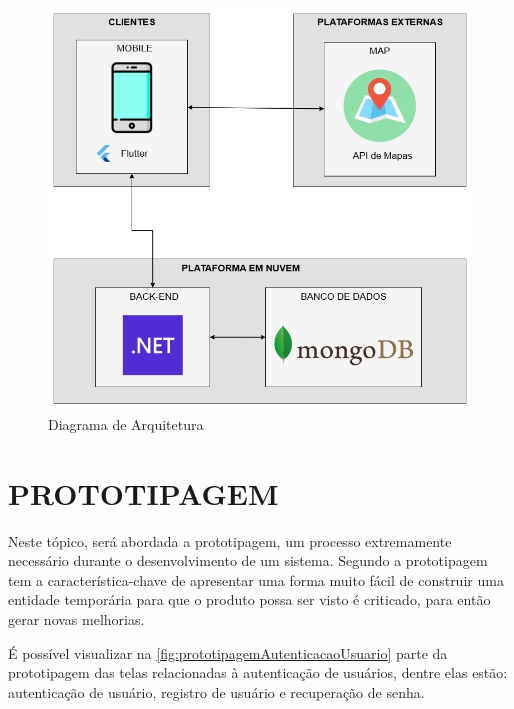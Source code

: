 \begin{figure}[H]
    \centering
    \caption{Diagrama de Arquitetura}
    \label{fig:diagramaArquiteturaDeSoftware}
    \includegraphics[scale=0.38]{./dados/figuras/diagrama-de-arquitetura.png}
\end{figure}

\section{PROTOTIPAGEM}
\label{sec:prototipagem}

Neste tópico, será abordada a prototipagem, um processo extremamente necessário durante o desenvolvimento de um sistema. Segundo  a prototipagem tem a característica-chave de apresentar uma forma muito fácil de construir uma entidade temporária para que o produto possa ser visto é criticado, para então gerar novas melhorias.

É possível visualizar na \autoref{fig:prototipagemAutenticacaoUsuario} parte da prototipagem das telas relacionadas à autenticação de usuários, dentre elas estão: autenticação de usuário, registro de usuário e recuperação de senha.

